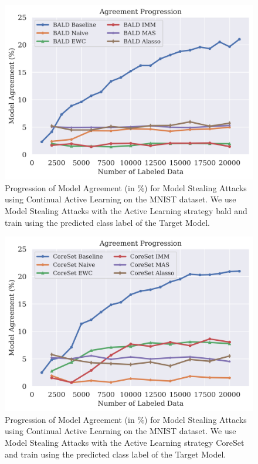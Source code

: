 \begin{figure}[h]
    \centering
    \includegraphics[width=0.7\linewidth]{images/results_CALMS/cifar100_label_bald.png}
    \caption[Agreement Comparison for Model Stealing on CIFAR10 using the predicted class label and the Active Learning strategy BALD]{Progression of Model Agreement
    (in \%) for Model Stealing Attacks using Continual Active Learning on the MNIST dataset. We use Model Stealing Attacks with the Active Learning strategy
    \gls{bald} and train using the predicted class label of the Target Model.}
    \label{fig:CALMSCIFAR10LabelBALD}
\end{figure}

\begin{figure}[h]
    \centering
    \includegraphics[width=0.7\linewidth]{images/results_CALMS/cifar100_label_coreset.png}
    \caption[Agreement Comparison for Model Stealing on CIFAR10 using the predicted class label and the Active Learning strategy CoreSet]{Progression of Model Agreement
    (in \%) for Model Stealing Attacks using Continual Active Learning on the MNIST dataset. We use Model Stealing Attacks with the Active Learning strategy
    CoreSet and train using the predicted class label of the Target Model.}
    \label{fig:CALMSCIFAR10LabelCoreSet}
\end{figure}

